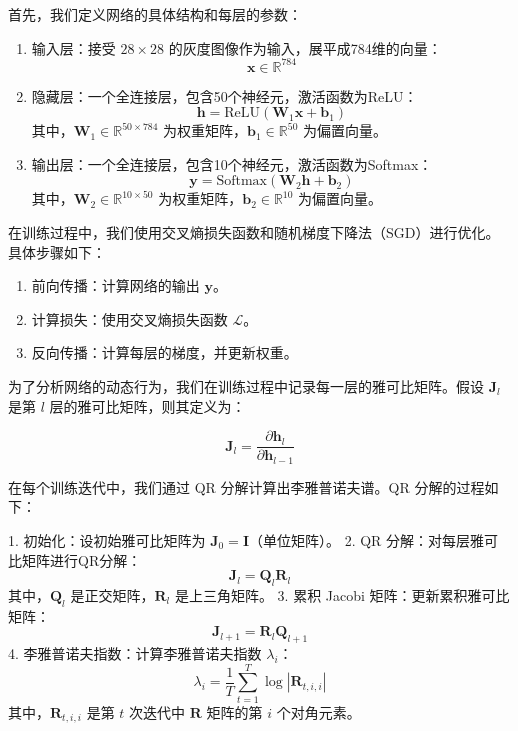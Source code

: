首先，我们定义网络的具体结构和每层的参数：

\begin{enumerate}
   \item 输入层：接受 $28\times28$ 的灰度图像作为输入，展平成784维的向量：
   \[
   \mathbf{x} \in \mathbb{R}^{784}
   \]

\item 隐藏层：一个全连接层，包含50个神经元，激活函数为ReLU：
   \[
   \mathbf{h} = \text{ReLU}(\mathbf{W}_1 \mathbf{x} + \mathbf{b}_1)
   \]
   其中，\(\mathbf{W}_1 \in \mathbb{R}^{50 \times 784}\) 为权重矩阵，\(\mathbf{b}_1 \in \mathbb{R}^{50}\) 为偏置向量。

\item 输出层：一个全连接层，包含10个神经元，激活函数为Softmax：
   \[
   \mathbf{y} = \text{Softmax}(\mathbf{W}_2 \mathbf{h} + \mathbf{b}_2)
   \]
   其中，\(\mathbf{W}_2 \in \mathbb{R}^{10 \times 50}\) 为权重矩阵，\(\mathbf{b}_2 \in \mathbb{R}^{10}\) 为偏置向量。
\end{enumerate}

在训练过程中，我们使用交叉熵损失函数和随机梯度下降法（SGD）进行优化。具体步骤如下：

\begin{enumerate}
   \item 前向传播：计算网络的输出 \(\mathbf{y}\)。
   \item 计算损失：使用交叉熵损失函数 \(\mathcal{L}\)。
   \item 反向传播：计算每层的梯度，并更新权重。
\end{enumerate}

为了分析网络的动态行为，我们在训练过程中记录每一层的雅可比矩阵。假设 \(\mathbf{J}_l\) 是第 \(l\) 层的雅可比矩阵，则其定义为：

\[
\mathbf{J}_l = \frac{\partial \mathbf{h}_l}{\partial \mathbf{h}_{l-1}}
\]

在每个训练迭代中，我们通过 QR 分解计算出李雅普诺夫谱。QR 分解的过程如下：

1. 初始化：设初始雅可比矩阵为 \(\mathbf{J}_0 = \mathbf{I}\)（单位矩阵）。
2. QR 分解：对每层雅可比矩阵进行QR分解：
   \[
   \mathbf{J}_l = \mathbf{Q}_l \mathbf{R}_l
   \]
   其中，\(\mathbf{Q}_l\) 是正交矩阵，\(\mathbf{R}_l\) 是上三角矩阵。
3. 累积 Jacobi 矩阵：更新累积雅可比矩阵：
   \[
   \mathbf{J}_{l+1} = \mathbf{R}_l \mathbf{Q}_{l+1}
   \]
4. 李雅普诺夫指数：计算李雅普诺夫指数 \(\lambda_i\)：
   \[
   \lambda_i = \frac{1}{T} \sum_{t=1}^T \log |\mathbf{R}_{t,i,i}|
   \]
   其中，\(\mathbf{R}_{t,i,i}\) 是第 \(t\) 次迭代中 \(\mathbf{R}\) 矩阵的第 \(i\) 个对角元素。

